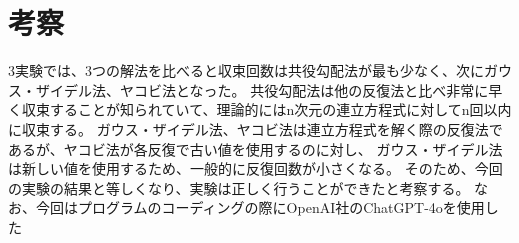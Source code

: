 \documentclass[]{jarticle}          %
\begin{document}
\section{考察}
3実験では、3つの解法を比べると収束回数は共役勾配法が最も少なく、次にガウス・ザイデル法、ヤコビ法となった。
共役勾配法は他の反復法と比べ非常に早く収束することが知られていて、理論的にはn次元の連立方程式に対してn回以内に収束する。
ガウス・ザイデル法、ヤコビ法は連立方程式を解く際の反復法であるが、ヤコビ法が各反復で古い値を使用するのに対し、
ガウス・ザイデル法は新しい値を使用するため、一般的に反復回数が小さくなる。
そのため、今回の実験の結果と等しくなり、実験は正しく行うことができたと考察する。
なお、今回はプログラムのコーディングの際にOpenAI社のChatGPT-4oを使用した
\end{document}

